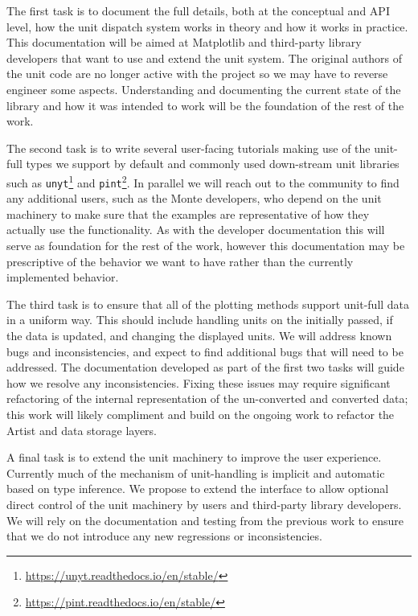 \documentclass[12pt]{article}
\numberwithin{page}{section}
\begin{document}
The first task is to document the full details, both at the conceptual
and API level, how the unit dispatch system works in theory and how it
works in practice.  This documentation will be aimed at Matplotlib and
third-party library developers that want to use and extend the unit
system.  The original authors of the unit code are no longer active
with the project so we may have to reverse engineer some aspects.
Understanding and documenting the current state of the library and how
it was intended to work will be the foundation of the rest of the
work.

The second task is to write several user-facing tutorials making use
of the unit-full types we support by default and commonly used
down-stream unit libraries such as
\texttt{unyt}\footnote{\url{https://unyt.readthedocs.io/en/stable/}}
and
\texttt{pint}\footnote{\url{https://pint.readthedocs.io/en/stable/}}.
In parallel we will reach out to the community to find any additional
users, such as the Monte developers, who depend on the unit machinery
to make sure that the examples are representative of how they actually
use the functionality.  As with the developer documentation this will
serve as foundation for the rest of the work, however this
documentation may be prescriptive of the behavior we want to have
rather than the currently implemented behavior.

The third task is to ensure that all of the plotting methods support
unit-full data in a uniform way.  This should include handling units
on the initially passed, if the data is updated, and changing the
displayed units.  We will address known bugs and inconsistencies, and
expect to find additional bugs that will need to be addressed.  The
documentation developed as part of the first two tasks will guide how
we resolve any inconsistencies.  Fixing these issues may require
significant refactoring of the internal representation of the
un-converted and converted data; this work will likely compliment and
build on the ongoing work to refactor the Artist and data storage
layers.

A final task is to extend the unit machinery to improve the user
experience.  Currently much of the mechanism of unit-handling is
implicit and automatic based on type inference.  We propose to extend
the interface to allow optional direct control of the unit machinery
by users and third-party library developers.  We will rely on the
documentation and testing from the previous work to ensure that we do
not introduce any new regressions or inconsistencies.
\end{document}
